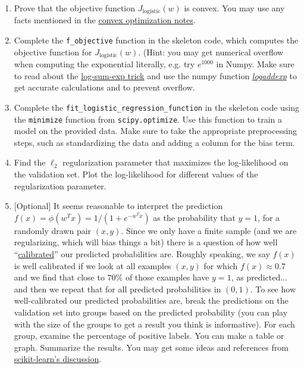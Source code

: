 \documentclass{article}
\theoremstyle{plain}
\theoremstyle{definition}
\begin{document}
\begin{enumerate}
  \setcounter{enumi}{\value{saveenum}}
\item Prove that the objective function $J_{\text{logistic}}(w)$ is convex.
You may use any facts mentioned in the \href{https://davidrosenberg.github.io/mlcourse/Notes/convex-optimization.pdf}{convex optimization notes}.

\item Complete the \texttt{f\_objective} function in the skeleton code,
which computes the objective function for $J_{\text{logistic}}(w)$.
(Hint: you may get numerical overflow when computing the exponential literally,
e.g. try $e^{1000}$ in Numpy.
Make sure to read about the
\href{https://blog.feedly.com/tricks-of-the-trade-logsumexp/}{log-sum-exp trick}
and use the numpy function
\textit{ \href{https://docs.scipy.org/doc/numpy/reference/generated/numpy.logaddexp.html}{logaddexp}
}
to get accurate calculations
and to prevent overflow.

\item Complete the \texttt{fit\_logistic\_regression\_function} in the skeleton
code using the \texttt{minimize} function from \texttt{scipy.optimize}.
Use this function to train
a model on the provided data. Make sure to take the appropriate preprocessing
steps, such as standardizing the data and adding a column for the
bias term. 

\item Find the $\ell_{2}$ regularization parameter that maximizes the log-likelihood
on the validation set. Plot the log-likelihood for different values
of the regularization parameter. 

\item {[}Optional{]} 
It seems reasonable to interpret the prediction $f(x)=\phi(w^{T}x)=1/(1+e^{-w^{T}x})$
as the probability that $y=1$, for a randomly drawn pair $\left(x,y\right)$.
Since we only have a finite sample (and we are regularizing, which
will bias things a bit) there is a question of how well ``\href{https://en.wikipedia.org/wiki/Calibration_(statistics)}{calibrated}''
our predicted probabilities are. Roughly speaking, we say $f(x)$
is well calibrated if we look at all examples $\left(x,y\right)$
for which $f(x)\approx0.7$ and we find that close to $70\%$ of those
examples have $y=1$, as predicted... and then we repeat that for
all predicted probabilities in $\left(0,1\right)$. To see how well-calibrated
our predicted probabilities are, break the predictions on the validation
set into groups based on the predicted probability (you can play with
the size of the groups to get a result you think is informative).
For each group, examine the percentage of positive labels. You can
make a table or graph. Summarize the results. You may get some ideas
and references from \href{http://scikit-learn.org/stable/modules/calibration.html}{scikit-learn's discussion}. 
\setcounter{saveenum}{\value{enumi}}
\end{enumerate}
\end{document}
